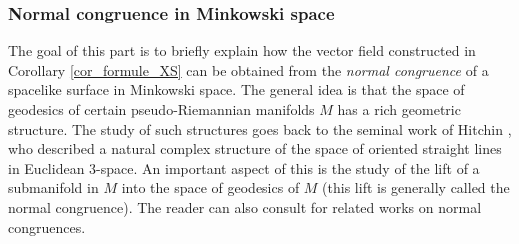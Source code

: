 \subsubsection{Normal congruence in Minkowski space}
The goal of this part is to briefly explain how the vector field constructed in Corollary \ref{cor_formule_XS} can be obtained from the \emph{normal congruence} of a spacelike surface in Minkowski space. The general idea is that the space of geodesics of certain pseudo-Riemannian manifolds $M$ has a rich geometric structure. The study of such structures goes back to the seminal work of Hitchin \cite{Monopole_Hitchin}, who described a natural complex structure of the space of oriented straight lines in Euclidean $3$-space. An important aspect of this is the study of the lift of a submanifold in $M$ into the space of geodesics of $M$ (this lift is generally called the normal congruence). The reader can also consult \cite{ML_in_tangent_bundle, Anciaux_space_of_geodesic, Emam_Seppi1} for related works on normal congruences.

